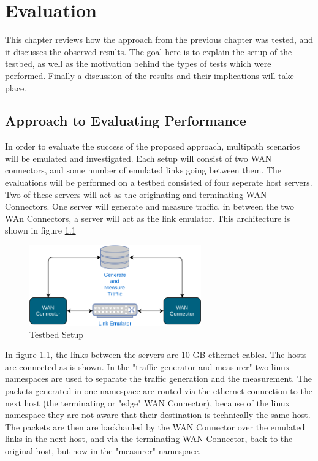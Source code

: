 
\cleardoublepage
\chapter{Evaluation}
\label{cha:evaluation}

This chapter reviews how the approach from the previous chapter was tested, and it discusses the observed results. The goal here is to explain the setup of the testbed, as well as the motivation behind the types of tests which were performed. Finally a discussion of the results and their implications will take place.


\section{Approach to Evaluating Performance}

In order to evaluate the success of the proposed approach, multipath scenarios will be emulated and investigated. Each setup will consist of two WAN connectors, and some number of emulated links going between them. The evaluations will be performed on a testbed consisted of four seperate host servers. Two of these servers will act as the originating and terminating WAN Connectors. One server will generate and measure traffic, in between the two WAn Connectors, a server will act as the link emulator. This architecture is shown in figure \ref{fig:testbed}

\begin{figure}[h]
    \centering
        \includegraphics[width=0.66\textwidth]{fig/testbed.png}
        \caption{Testbed Setup}
        \label{fig:testbed}
\end{figure}

In figure \ref{fig:testbed}, the links between the servers are 10 GB ethernet cables. The hosts are connected as is shown. In the "traffic generator and measurer" two linux namespaces are used to separate the traffic generation and the measurement. The packets generated in one namespace are routed via the ethernet connection to the next host (the terminating or "edge" WAN Connector), because of the linux namespace they are not aware that their destination is technically the same host. The packets are then are backhauled by the WAN Connector over the emulated links in the next host, and via the terminating WAN Connector, back to the original host, but now in the "measurer" namespace.

